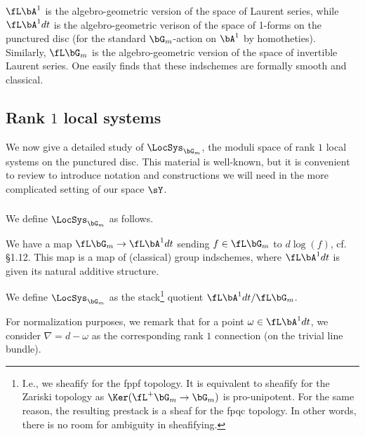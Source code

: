 \begin{example}
\notready

$\fL \bA^1$ is the algebro-geometric version of the space of Laurent
series, while $\fL \bA^1 dt$ is the algebro-geometric verison of the
space of 1-forms on the punctured disc (for the standard $\bG_m$-action
on $\bA^1$ by homotheties). Similarly, $\fL \bG_m$ is the algebro-geometric
version of the space of invertible Laurent series.
One easily finds that these indschemes are formally smooth and classical.

\end{example}

\subsection{Rank $1$ local systems}\label{ss:rk1-ls}

We now give a detailed study of $\LocSys_{\bG_m}$, the moduli space of
rank $1$ local systems on the punctured disc. This material is well-known,
but it is convenient to review to introduce notation and constructions
we will need in the more complicated setting of our space $\sY$.

\subsubsection{}

We define $\LocSys_{\bG_m}$ as follows.

We have a map $\fL \bG_m \to \fL \bA^1 dt$ sending
$f \in \fL \bG_m$ to $d\log(f)$, cf. \cite{locsys} \S 1.12.
This map is a map of (classical) group indschemes, where
$\fL \bA^1 dt$ is given its natural additive structure.

We define $\LocSys_{\bG_m}$ as the stack\footnote{I.e., we sheafify
for the fppf topology. It is equivalent to sheafify for the
Zariski topology as $\Ker(\fL^+ \bG_m \to \bG_m)$ is pro-unipotent.
For the same reason, the resulting prestack is a sheaf for the
fpqc topology. In other words, there is no room for ambiguity in
sheafifying.}
quotient $\fL \bA^1 dt/\fL \bG_m$.

\begin{rem}
\notready

For normalization purposes, we remark that for
a point $\omega \in \fL \bA^1 dt$, we consider
$\nabla = d - \omega$ as the corresponding rank $1$ connection
(on the trivial line bundle).

\end{rem}

